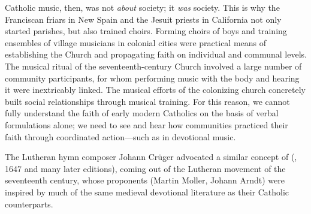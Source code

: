 Catholic music, then, was not \emph{about} society; it \emph{was} society.
This is why the Franciscan friars in New Spain and the Jesuit priests in
California not only started parishes, but also trained choirs.
Forming choirs of boys and training ensembles of village musicians in colonial
cities were practical means of establishing the Church and propagating faith on
individual and communal levels.
The musical ritual of the seventeenth-century Church involved a large number of
community participants, for whom performing music with the body and hearing it
were inextricably linked.
The musical efforts of the colonizing church concretely built social
relationships through musical training.%
    \Autocite{RamosKittrell:PlayingCathedral}
For this reason, we cannot fully understand the faith of early modern Catholics
on the basis of verbal formulations alone; we need to see and hear how
communities practiced their faith through coordinated action---such as in
devotional music.%
\begin{Footnote}
    The Lutheran hymn composer Johann Crüger advocated a similar concept of
     (,
    1647 and many later editions), coming out of the Lutheran 
    movement of the seventeenth century, whose proponents (Martin Moller, Johann
    Arndt) were inspired by much of the same medieval devotional literature as
    their Catholic counterparts.
\end{Footnote}






